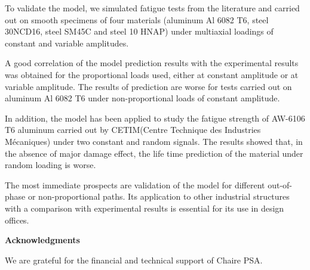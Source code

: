 \documentclass[3p,times,number,review]{elsarticle}
\begin{document}
To validate the model, we simulated fatigue tests from the literature and carried out on smooth specimens of four materials (aluminum Al 6082 T6,  steel 30NCD16, steel SM45C and steel 10 HNAP) under multiaxial loadings of constant and variable amplitudes.

A good correlation of the model prediction results with the experimental results was obtained for the proportional loads used, either at constant amplitude or at variable amplitude. The results of prediction are worse for tests carried out on aluminum Al 6082 T6 under non-proportional loads of constant amplitude.

In addition, the model has been applied to study the fatigue strength of AW-6106 T6 aluminum carried out by CETIM(Centre Technique des Industries Mécaniques) under two constant and random signals. The results showed that, in the absence of major damage effect, the life time prediction of the material under random loading is worse. 

The most immediate prospects are validation of the model for different out-of-phase or non-proportional paths. Its application to other industrial structures with a comparison with experimental results is essential for its use in design offices.








\vspace{6pt}
\noindent
\textbf{Acknowledgments}

\vspace{6pt}
We are grateful for the financial and technical support of Chaire PSA.






%	
%	
\end{document}
